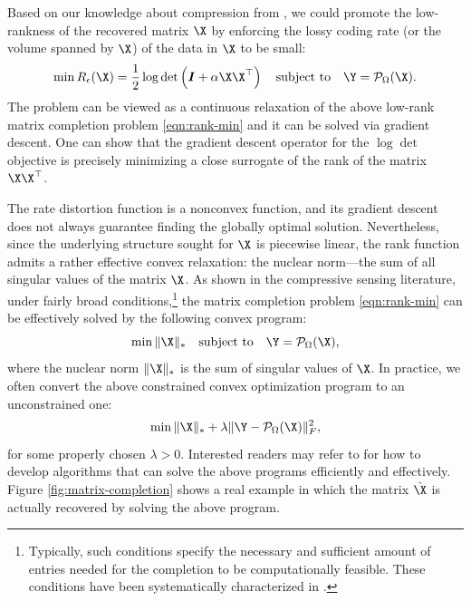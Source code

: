 \documentclass[../../book-main.tex]{subfiles}
\begin{document}
Based on our knowledge about compression from
, we could promote the low-rankness of the
recovered matrix $\X$ by enforcing the lossy coding rate (or the
volume spanned by $\X$) of the data in $\X$ to be small:
\begin{equation}
    \min R_\epsilon(\X) = \frac{1}{2} \log \det \left(\boldsymbol{I} +
    \alpha  \X\X^\top \right) \quad \mbox{subject to}
    \quad
    \Y = \mathcal{P}_{\Omega}(\X).
    \label{eqn:rate-min}
\end{equation}
The problem can be viewed as a continuous relaxation of the above
low-rank matrix completion problem \eqref{eqn:rank-min} and it can be
solved via gradient descent. One can show that the gradient descent
operator for the $\log\det$ objective is precisely minimizing a close
surrogate of the rank of the matrix $\X\X^\top$.

The rate distortion function is a nonconvex function, and its gradient
descent does not always guarantee finding the globally optimal
solution. Nevertheless, since the underlying structure sought for
$\X$ is piecewise linear, the rank function admits a rather effective
convex relaxation: the
nuclear norm---the sum of all singular values of the matrix $\X$. As
shown in the compressive sensing literature, under fairly
broad conditions,\footnote{Typically, such conditions specify the
    necessary and sufficient amount of entries needed for the completion
    to be computationally feasible. These conditions have been
systematically characterized in \cite{Wright-Ma-2022}.} the matrix
completion problem \eqref{eqn:rank-min}
can be effectively solved by the following convex program:
\begin{equation}
    \min \|\X\|_* \quad \mbox{subject to}
    \quad
    \Y = \mathcal{P}_{\Omega}(\X),
    \label{eqn:nuclear-min}
\end{equation}
where the nuclear norm $\|\X\|_*$ is the sum of singular values of
$\X$. In practice, we often convert the above constrained convex optimization
program to an unconstrained one:
\begin{equation}
    \min \|\X\|_*  + \lambda \|
    \Y - \mathcal{P}_{\Omega}(\X)\|_F^2,
    \label{eqn:nuclear-min-lagrangian}
\end{equation}
for some properly chosen $\lambda > 0$. Interested readers may refer to
\cite{Wright-Ma-2022} for how to develop algorithms that can solve
the above programs efficiently and effectively.
Figure \ref{fig:matrix-completion} shows a real example in which the
matrix $\hat \X$ is actually recovered by solving the above program.
\end{document}
